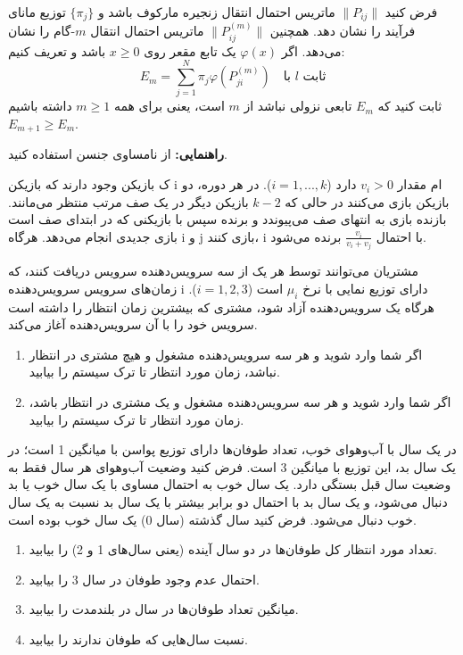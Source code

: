 \documentclass[11pt, a4, twoside]{article}
\begin{document}
\begin{problem}
فرض کنید $\|P_{ij}\|$ ماتریس احتمال انتقال زنجیره مارکوف باشد و $\{\pi_j\}$ توزیع مانای فرآیند را نشان دهد. همچنین $\|P^{(m)}_{ij}\|$ ماتریس احتمال انتقال $m$-گام را نشان می‌دهد. اگر $\varphi(x)$ یک تابع مقعر روی $x \geq 0$ باشد و تعریف کنیم:
\[
E_m = \sum_{j=1}^N \pi_j \varphi(P^{(m)}_{ji}) \quad \text{با $l$ ثابت}
\]
ثابت کنید که $E_m$ تابعی نزولی نباشد از $m$ است، یعنی برای همه $m \geq 1$ داشته باشیم $E_{m+1} \geq E_m$.

\noindent
\textbf{راهنمایی:} از نامساوی جنسن استفاده کنید.
\end{problem}

\begin{problem}
ک بازیکن وجود دارند که بازیکن i ام مقدار $v_i > 0$ دارد ($i = 1,...,k$). در هر دوره، دو بازیکن بازی می‌کنند در حالی که $k-2$ بازیکن دیگر در یک صف مرتب منتظر می‌مانند. بازنده بازی به انتهای صف می‌پیوندد و برنده سپس با بازیکنی که در ابتدای صف است بازی جدیدی انجام می‌دهد. هرگاه i و j بازی کنند، i با احتمال $\frac{v_i}{v_i+v_j}$ برنده می‌شود.
\end{problem}

\begin{problem}
مشتریان می‌توانند توسط هر یک از سه سرویس‌دهنده سرویس دریافت کنند، که زمان‌های سرویس سرویس‌دهنده i دارای توزیع نمایی با نرخ $\mu_i$ است ($i = 1, 2, 3$). هرگاه یک سرویس‌دهنده آزاد شود، مشتری که بیشترین زمان انتظار را داشته است سرویس خود را با آن سرویس‌دهنده آغاز می‌کند.
\begin{enumerate}[label=(\alph*)]
\item اگر شما وارد شوید و هر سه سرویس‌دهنده مشغول و هیچ مشتری در انتظار نباشد، زمان مورد انتظار تا ترک سیستم را بیابید.
\item اگر شما وارد شوید و هر سه سرویس‌دهنده مشغول و یک مشتری در انتظار باشد، زمان مورد انتظار تا ترک سیستم را بیابید.
\end{enumerate}
\end{problem}

\begin{problem}
در یک سال با آب‌وهوای خوب، تعداد طوفان‌ها دارای توزیع پواسن با میانگین 1 است؛ در یک سال بد، این توزیع با میانگین 3 است. فرض کنید وضعیت آب‌وهوای هر سال فقط به وضعیت سال قبل بستگی دارد. یک سال خوب به احتمال مساوی با یک سال خوب یا بد دنبال می‌شود، و یک سال بد با احتمال دو برابر بیشتر با یک سال بد نسبت به یک سال خوب دنبال می‌شود. فرض کنید سال گذشته (سال 0) یک سال خوب بوده است.
\begin{enumerate}[label=(\alph*)]
\item تعداد مورد انتظار کل طوفان‌ها در دو سال آینده (یعنی سال‌های 1 و 2) را بیابید.
\item احتمال عدم وجود طوفان در سال 3 را بیابید.
\item میانگین تعداد طوفان‌ها در سال در بلندمدت را بیابید.
\item نسبت سال‌هایی که طوفان ندارند را بیابید.
\end{enumerate}
\end{problem}
\end{document}
